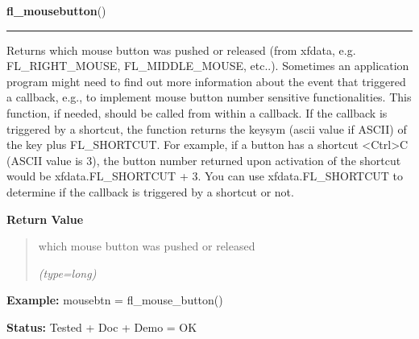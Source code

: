 \hspace{.8\funcindent}\begin{boxedminipage}{\funcwidth}

    \raggedright \textbf{fl\_mousebutton}()

    \vspace{-1.5ex}

    \rule{\textwidth}{0.5\fboxrule}
\setlength{\parskip}{2ex}
    Returns which mouse button was pushed or released (from xfdata, e.g. 
    FL\_RIGHT\_MOUSE, FL\_MIDDLE\_MOUSE, etc..). Sometimes an application 
    program might need to find out more information about the event that 
    triggered a callback, e.g., to implement mouse button number sensitive 
    functionalities. This function, if needed, should be called from within
    a callback. If the callback is triggered by a shortcut, the function 
    returns the keysym (ascii value if ASCII) of the key plus FL\_SHORTCUT.
    For example, if a button has a shortcut {\textless}Ctrl{\textgreater}C 
    (ASCII value is 3), the button number returned upon activation of the 
    shortcut would be xfdata.FL\_SHORTCUT + 3. You can use 
    xfdata.FL\_SHORTCUT to determine if the callback is triggered by a 
    shortcut or not.

\setlength{\parskip}{1ex}
      \textbf{Return Value}
    \vspace{-1ex}

      \begin{quote}
      which mouse button was pushed or released

      {\it (type=long)}

      \end{quote}

\textbf{Example:} mousebtn = fl\_mouse\_button()



\textbf{Status:} Tested + Doc + Demo = OK



    \end{boxedminipage}

    \label{xformslib:flbasic:fl_set_err_logfp}

    \vspace{0.5ex}

